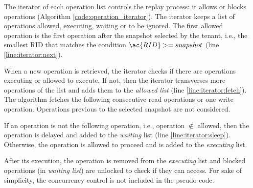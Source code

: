 The iterator of each operation list controls the replay process: it allows or blocks operations (Algorithm \ref{code:operation_iterator}). The iterator keeps a list of operations allowed, executing, waiting or to be ignored. The first allowed operation is the first operation after the snapshot selected by the tenant, i.e., the smallest \ac{RID} that matches the condition $\ac{RID} >= snapshot$ (line \ref{line:iterator:next}). 

When a new operation is retrieved, the iterator checks if there are operations executing or allowed to execute. If not, then the iterator transverses more operations of the list and adds them to the \emph{allowed list} (line \ref{line:iterator:fetch}). The algorithm fetches the following consecutive read operations or one write operation. Operations previous to the selected snapshot are not considered.

If an operation is not the following operation, i.e., operation $\notin$ allowed, then the operation is delayed and added to the \emph{waiting} list (line \ref{line:iterator:sleep}). Otherwise, the operation is allowed to proceed and is added to the \emph{executing} list.

After its execution, the operation is removed from the \emph{executing} list and blocked operations (in \emph{waiting list}) are unlocked to check if they can access. For sake of simplicity, the concurrency control is not included in the pseudo-code. \\


